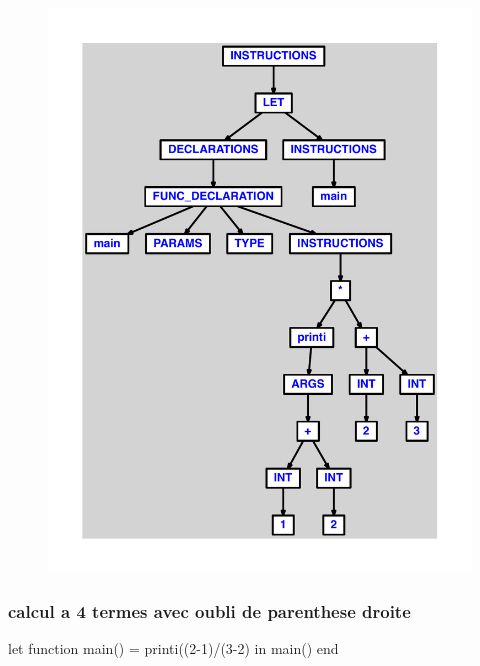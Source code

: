 \documentclass{article}
\begin{document}
\begin{figure}[H]\centering\includegraphics[max width=\textwidth]{ast/ast_31.pdf}\end{figure}\subsubsection{calcul a 4 termes avec oubli de parenthese droite}
\begin{verbatimtab}
let function main() = printi((2-1)/(3-2) in main() end
\end{verbatimtab}
\end{document}
